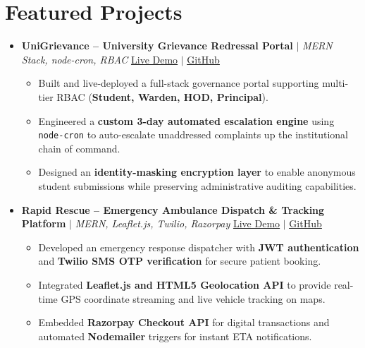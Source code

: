 \documentclass[letterpaper,10pt]{article}
\begin{document}
\section{Featured Projects}
    \begin{itemize}[leftmargin=0.15in, label={}]
      \item
        \textbf{UniGrievance -- University Grievance Redressal Portal} $|$ \emph{MERN Stack, node-cron, RBAC} \hfill \href{https://portfolio-beta-orpin-62.vercel.app/}{\underline{Live Demo}} $|$ \href{https://github.com/Vikramaditya21N/UniGrievance}{\underline{GitHub}}
        \begin{itemize}
          \item Built and live-deployed a full-stack governance portal supporting multi-tier RBAC (\textbf{Student, Warden, HOD, Principal}).
          \item Engineered a \textbf{custom 3-day automated escalation engine} using \texttt{node-cron} to auto-escalate unaddressed complaints up the institutional chain of command.
          \item Designed an \textbf{identity-masking encryption layer} to enable anonymous student submissions while preserving administrative auditing capabilities.
        \end{itemize}

      \item
        \textbf{Rapid Rescue -- Emergency Ambulance Dispatch \& Tracking Platform} $|$ \emph{MERN, Leaflet.js, Twilio, Razorpay} \hfill \href{https://portfolio-beta-orpin-62.vercel.app/}{\underline{Live Demo}} $|$ \href{https://github.com/Vikramaditya21N/RapidRescue}{\underline{GitHub}}
        \begin{itemize}
          \item Developed an emergency response dispatcher with \textbf{JWT authentication} and \textbf{Twilio SMS OTP verification} for secure patient booking.
          \item Integrated \textbf{Leaflet.js and HTML5 Geolocation API} to provide real-time GPS coordinate streaming and live vehicle tracking on maps.
          \item Embedded \textbf{Razorpay Checkout API} for digital transactions and automated \textbf{Nodemailer} triggers for instant ETA notifications.
        \end{itemize}


\end{itemize}
\end{document}
